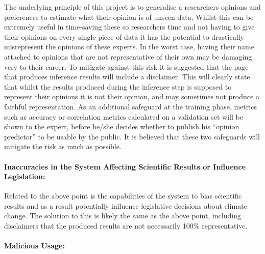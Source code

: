 \documentclass{ecmm427_assignment}
\begin{document}
\quad The underlying principle of this project is to generalise a researchers
opinions and preferences to estimate what their opinion is of unseen
data. Whilst this can be extremely useful in time-saving these so
researchers time and not having to give their opinions on every single
piece of data it has the potential to drastically misrepresent the
opinions of these experts. In the worst case, having their name attached
to opinions that are not representative of their own may be damaging
very to their career. To mitigate against this risk it is suggested
that the page that produces inference results will include a disclaimer. This will clearly state that whilst the results produced during the inference
step is supposed to represent their opinions it is not their opinion,
and may sometimes not produce a faithful representation. As an additional
safeguard at the training phase, metrics such as accuracy or correlation
metrics calculated on a validation set will be shown to the expert,
before he/she decides whether to publish his ``opinion predictor''
to be usable by the public. It is believed that these two safeguards
will mitigate the risk as much as possible.\\

\paragraph{Inaccuracies in the System Affecting Scientific Results or Influence
Legislation: }

\quad Related to the above point is the capabilities of the system to bias
scientific results and as a result potentially influence legislative
decisions about climate change. The solution to this is likely the
same as the above point, including disclaimers that the produced results
are not necessarily 100\% representative. \\

\paragraph{Malicious Usage:}
\end{document}
